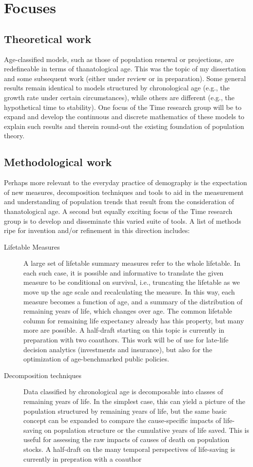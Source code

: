 \documentclass[a4paper,12pt]{article}
\begin{document}
\section{Focuses}
\subsection{Theoretical work}
Age-classified models, such as those of population renewal or projections, are
redefineable in terms of thanatological age. This was the topic of my
dissertation and some subsequent work (either under review or in preparation).
Some general results remain identical to models structured by chronological age (e.g., the growth rate under certain
circumstances), while others are different (e.g., the hypothetical time to stability). One focus of the Time research group will be to expand and develop the continuous and discrete mathematics of
these models to explain such results and therein round-out the existing
foundation of population theory.

\subsection{Methodological work}
Perhaps more relevant to the everyday practice of demography is the expectation
of new measures, decomposition techniques and tools to aid in the measurement
and understanding of population trends that result from the consideration of
thanatological age. A second but equally exciting focus of the Time research
group is to develop and disseminate this varied suite of tools. A list of
methods ripe for invention and/or refinement in this direction includes:

\begin{description}
\item[Lifetable Measures]{A large set of lifetable summary measures refer to
the whole lifetable. In each such case, it is possible and
informative to translate the given measure to be conditional on survival, i.e.,
truncating the lifetable as we move up the age scale and recalculating the
measure. In this way, each measure becomes a function of age, and a summary of
the distribution of remaining years of life, which changes over age. The common
lifetable column for remaining life expectancy already has this property, but many more are possible. A half-draft
starting on this topic is currently in preparation with two coauthors.
This work will be of use for late-life decision analytics (investments and insurance), but also for the optimization of age-benchmarked public policies.}
\item[Decomposition techniques]{Data classified by chronological age is
decomposable into classes of remaining years of life. In the simplest case,
this can yield a picture of the population structured by remaining years of life, but
the same basic concept can be expanded to compare the cause-specific impacts of
life-saving on population structure or the cumulative
years of life saved. This is useful for assessing the raw impacts of causes of
death on population stocks. A half-draft on the many temporal perspectives of life-saving is currently in prepration with a coauthor}
\end{description}
\end{document}
